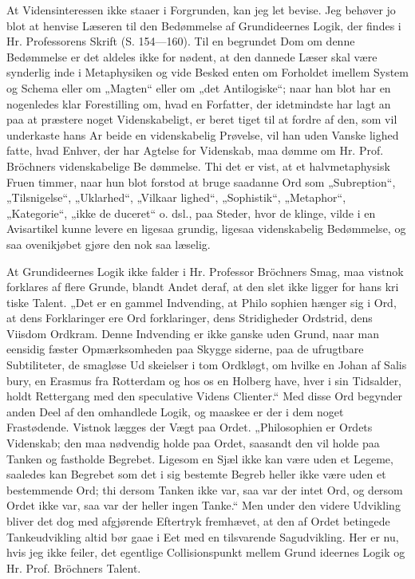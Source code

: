 \documentclass[12pt]{book}
\newcommand{\opage}[1]{\marginnote{\footnotesize\textit{[#1]}}}
\begin{document}
At Vidensinteressen ikke staaer i Forgrunden, kan
jeg let bevise. Jeg behøver jo blot at henvise Læseren
til den Bedømmelse af Grundideernes Logik, der findes i
Hr. Professorens Skrift (S. 154---160). Til en begrundet
Dom om denne Bedømmelse er det aldeles ikke for\-%
nødent, at den dannede Læser skal være synderlig inde
i Metaphysiken og vide Besked enten om Forholdet
imellem System og Schema eller om „Magten“ eller om
„det Antilogiske“; naar han blot har en nogenledes klar %
Forestilling om, hvad en Forfatter, der idetmindste har
lagt an paa at præstere noget Videnskabeligt, er beret\-%
tiget til at fordre af den, som vil underkaste hans Ar\-%
beide en videnskabelig Prøvelse, vil han uden Vanske\-%
lighed fatte, hvad Enhver, der har Agtelse for Videnskab,
maa dømme om Hr. Prof. Bröchners videnskabelige Be\-%
dømmelse. Thi det er vist, at et halvmetaphysisk Fruen\-%
timmer, naar hun blot forstod at bruge saadanne Ord
som „Subreption“, „Tilsnigelse“, „Uklarhed“, „Vilkaar\-%
lighed“, „Sophistik“, „Metaphor“, „Kategorie“, „ikke de\-%
duceret“ o. dsl., paa Steder, hvor de klinge, vilde i
en Avisartikel kunne levere en ligesaa grundig, ligesaa
videnskabelig Bedømmelse, og saa ovenikjøbet gjøre den
nok saa læselig.

At Grundideernes Logik ikke falder i Hr. Professor
Bröchners Smag, maa vistnok forklares af flere Grunde,
blandt Andet deraf, at den slet ikke ligger for hans kri\-%
\opage{48}\setcounter{footnote}{0}%
tiske Talent. „Det er en gammel Indvending, at Philo\-%
sophien hænger sig i Ord, at dens Forklaringer ere Ord\-%
forklaringer, dens Stridigheder Ordstrid, dens Viisdom
Ordkram. Denne Indvending er ikke ganske uden Grund,
naar man eensidig fæster Opmærksomheden paa Skygge\-%
siderne, paa de ufrugtbare Subtiliteter, de smagløse Ud\-%
skeielser i tom Ordkløgt, om hvilke en Johan af Salis\-%
bury, en Erasmus fra Rotterdam og hos os en Holberg
have, hver i sin Tidsalder, holdt Rettergang med den
speculative Videns Clienter.“ Med disse Ord begynder
anden Deel af den omhandlede Logik, og maaskee er der i
dem noget Frastødende. Vistnok lægges der Vægt paa Ordet.
„Philosophien er Ordets Videnskab; den maa nødvendig
holde paa Ordet, saasandt den vil holde paa Tanken og
fastholde Begrebet. Ligesom en Sjæl ikke kan være
uden et Legeme, saaledes kan Begrebet som det i sig
bestemte Begreb heller ikke være uden et bestemmende
Ord; thi dersom Tanken ikke var, saa var der intet
Ord, og dersom Ordet ikke var, saa var der heller ingen
Tanke.“ Men under den videre Udvikling bliver det
dog med afgjørende Eftertryk fremhævet, at den af
Ordet betingede Tankeudvikling altid bør gaae i Eet
med en tilsvarende Sagudvikling. Her er nu, hvis jeg
ikke feiler, det egentlige Collisionspunkt mellem Grund\-%
ideernes Logik og Hr. Prof. Bröchners Talent.
\end{document}
